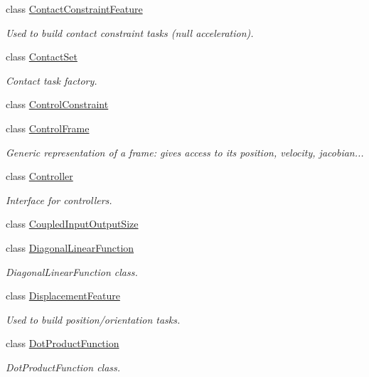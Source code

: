 \begin{DoxyCompactItemize}
class \hyperlink{classocra_1_1ContactConstraintFeature}{Contact\+Constraint\+Feature}
\begin{DoxyCompactList}\small\item\em Used to build contact constraint tasks (null acceleration). \end{DoxyCompactList}\item 
class \hyperlink{classocra_1_1ContactSet}{Contact\+Set}
\begin{DoxyCompactList}\small\item\em Contact task factory. \end{DoxyCompactList}\item 
class \hyperlink{classocra_1_1ControlConstraint}{Control\+Constraint}
\item 
class \hyperlink{classocra_1_1ControlFrame}{Control\+Frame}
\begin{DoxyCompactList}\small\item\em Generic representation of a frame\+: gives access to its position, velocity, jacobian... \end{DoxyCompactList}\item 
class \hyperlink{classocra_1_1Controller}{Controller}
\begin{DoxyCompactList}\small\item\em Interface for controllers. \end{DoxyCompactList}\item 
class \hyperlink{classocra_1_1CoupledInputOutputSize}{Coupled\+Input\+Output\+Size}
\item 
class \hyperlink{classocra_1_1DiagonalLinearFunction}{Diagonal\+Linear\+Function}
\begin{DoxyCompactList}\small\item\em Diagonal\+Linear\+Function class. \end{DoxyCompactList}\item 
class \hyperlink{classocra_1_1DisplacementFeature}{Displacement\+Feature}
\begin{DoxyCompactList}\small\item\em Used to build position/orientation tasks. \end{DoxyCompactList}\item 
class \hyperlink{classocra_1_1DotProductFunction}{Dot\+Product\+Function}
\begin{DoxyCompactList}\small\item\em Dot\+Product\+Function class. \end{DoxyCompactList}\item 

\end{DoxyCompactItemize}
